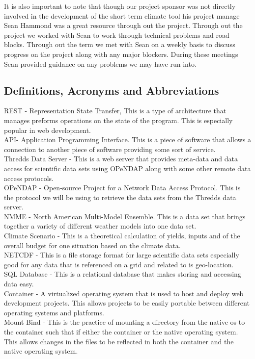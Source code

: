 \documentclass[onecolumn, draftclsnofoot,10pt, compsoc]{article}
\begin{document}
            It is also important to note that though our project sponsor was not directly involved in the development of the short term climate tool his project manage Sean Hammond was a great resource through out the project. Through out the project we worked with Sean to work through technical problems and road blocks. Through out the term we met with Sean on a weekly basis to discuss progress on the project along with any major blockers. During these meetings Sean provided guidance on any problems we may have run into.\\

		\subsection{Definitions, Acronyms and Abbreviations}
			REST - Representation State Transfer, This is a type of architecture that manages preforms operations on the state of the program. This is especially popular in web development.\\
			API- Application Programming Interface. This is a piece of software that allows a connection to another piece of software providing some sort of service.\\
			Thredds Data Server - This is a web server that provides meta-data and data access for scientific data sets using OPeNDAP along with some other remote data access protocols.\\
			OPeNDAP - Open-source Project for a Network Data Access Protocol. This is the protocol we will be using to retrieve the data sets from the Thredds data server.\\
			NMME - North American Multi-Model Ensemble. This is a data set that brings together a variety of different weather models into one data set.\\
			Climate Scenario - This is a theoretical calculation of yields, inputs and of the overall budget for one situation based on the climate data.\\
			NETCDF - This is a file storage format for large scientific data sets especially good for any data that is referenced on a grid and related to is geo-location.\\
			SQL Database - This is a relational database that makes storing and accessing data easy.\\
			Container - A virtualized operating system that is used to host and deploy web development projects. This allows projects to be easily portable between different operating systems and platforms.\\
			Mount Bind - This is the practice of mounting a directory from the native os to the container such that if either the container or the native operating system. This allows changes in the files to be reflected in both the container and the native operating system.\\
\end{document}
